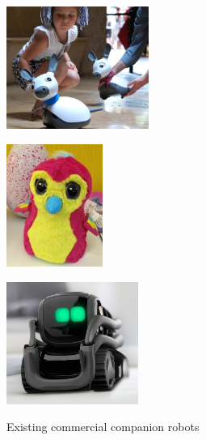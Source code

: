 \documentclass[11pt,a4paper]{report}
\begin{document}
\begin{figure}[!htbp]
    \begin{minipage}[b]{.3\linewidth}
        \centering\includegraphics[height=4cm]{figs/miro.jpg}
        \label{fig:miro}
    \end{minipage}%
    \hspace{0.1cm}
    \begin{minipage}[b]{.3\linewidth}
        \centering
        \includegraphics[height=4cm]{figs/hatchnimals.jpg}
        \label{fig:hatchimals}
    \end{minipage}%
    \hspace{0.1cm}
    \begin{minipage}[b]{.3\linewidth}
        \centering
        \includegraphics[height=4cm]{figs/anki-vector.jpg}
        \label{fig:vector}
    \end{minipage}
    \caption{Existing commercial companion robots}\label{fig:commercial-robots}
\end{figure}
\end{document}
